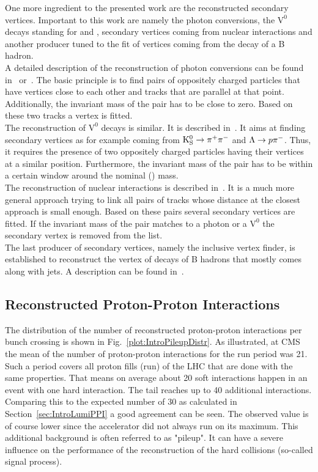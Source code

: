 One more ingredient to the presented work are the reconstructed secondary vertices. Important to this work are namely the photon conversions, the $\text{V}^{\text{0}}$ decays standing for \PKzS{} and \PgL{}, secondary vertices coming from nuclear interactions and another producer tuned to the fit of vertices coming from the decay of a B hadron. \\
A detailed description of the reconstruction of photon conversions can be found in~\cite{GiordanoConversion} or~\cite{CMS-PAS-EGM-10-005}. The basic principle is to find pairs of oppositely charged particles that have vertices close to each other and tracks that are parallel at that point. Additionally, the invariant mass of the pair has to be close to zero. Based on these two tracks a vertex is fitted. \\
The reconstruction of $\text{V}^{\text{0}}$ decays is similar. It is described in~. It aims at finding secondary vertices as for example coming from $\mathrm{K}^0_\mathrm{S}{} \rightarrow{} \pi{}^{+}{}\pi{}^{-}{}$ and $\Lambda{}{} \rightarrow{} p\pi{}^{-}{}$. Thus, it requires the presence of two oppositely charged particles having their vertices at a similar position. Furthermore, the invariant mass of the pair has to be within a certain window around the nominal \PKzS{} (\PgL{}) mass. \\
The reconstruction of nuclear interactions is described in~. It is a much more general approach trying to link all pairs of tracks whose distance at the closest approach is small enough. Based on these pairs several secondary vertices are fitted. If the invariant mass of the pair matches to a photon or a $\text{V}^{\text{0}}$ the secondary vertex is removed from the list. \\
The last producer of secondary vertices, namely the inclusive vertex finder, is established to reconstruct the vertex of decays of B hadrons that mostly comes along with jets. A description can be found in~.


\subsection{Reconstructed Proton-Proton Interactions}

The distribution of the number of reconstructed proton-proton interactions per bunch crossing is shown in Fig.~\ref{plot:IntroPileupDistr}. As illustrated, at CMS the mean of the number of proton-proton interactions for the run period was 21. Such a period covers all proton fills (run) of the LHC that are done with the same properties. That means on average about 20 soft interactions happen in an event with one hard interaction. The tail reaches up to 40 additional interactions. Comparing this to the expected number of 30 as calculated in Section~\ref{sec:IntroLumiPPI} a good agreement can be seen. The observed value is of course lower since the accelerator did not always run on its maximum. This additional background is often referred to as "pileup". It can have a severe influence on the performance of the reconstruction of the hard collisions (so-called signal process).


